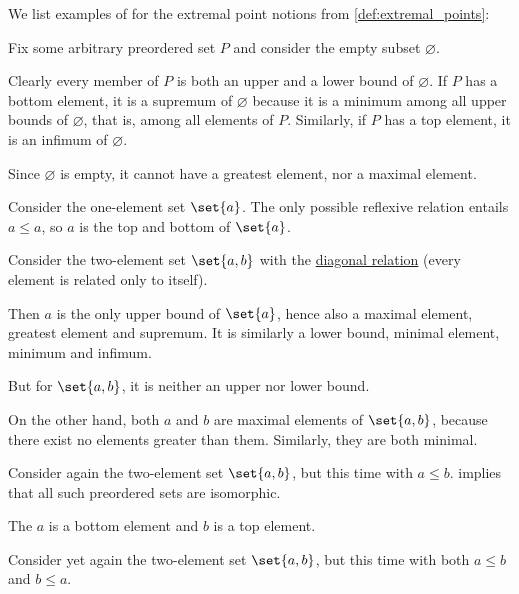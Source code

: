 \begin{example}\label{ex:thm:def:extremal_points}
  We list examples of for the extremal point notions from \cref{def:extremal_points}:
  \begin{thmenum}
     Fix some arbitrary preordered set \( P \) and consider the empty subset \( \varnothing \).

    Clearly every member of \( P \) is both an upper and a lower bound of \( \varnothing \). If \( P \) has a bottom element, it is a supremum of \( \varnothing \) because it is a minimum among all upper bounds of \( \varnothing \), that is, among all elements of \( P \). Similarly, if \( P \) has a top element, it is an infimum of \( \varnothing \).

    Since \( \varnothing \) is empty, it cannot have a greatest element, nor a maximal element.

     Consider the one-element set \( \set{ a } \). The only possible reflexive relation entails \( a \leq a \), so \( a \) is the top and bottom of \( \set{ a } \).

     Consider the two-element set \( \set{ a, b } \) with the \hyperref[def:binary_relation/diagonal]{diagonal relation} (every element is related only to itself).

    Then \( a \) is the only upper bound of \( \set{ a } \), hence also a maximal element, greatest element and supremum. It is similarly a lower bound, minimal element, minimum and infimum.

    But for \( \set{ a, b } \), it is neither an upper nor lower bound.

    On the other hand, both \( a \) and \( b \) are maximal elements of \( \set{ a, b } \), because there exist no elements greater than them. Similarly, they are both minimal.

     Consider again the two-element set \( \set{ a, b } \), but this time with \( a \leq b \).  implies that all such preordered sets are isomorphic.

    The \( a \) is a bottom element and \( b \) is a top element.

     Consider yet again the two-element set \( \set{ a, b } \), but this time with both \( a \leq b \) and \( b \leq a \).


\end{thmenum}
\end{example}
